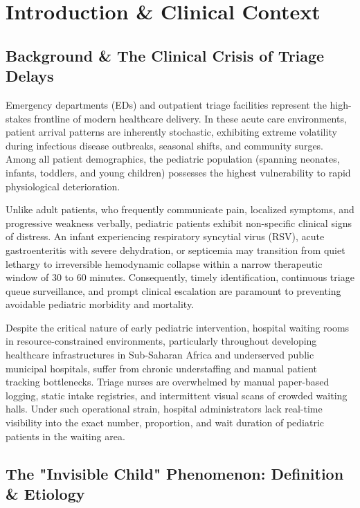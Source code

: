 \chapter{Introduction \& Clinical Context}

\section{Background \& The Clinical Crisis of Triage Delays}

Emergency departments (EDs) and outpatient triage facilities represent the high-stakes frontline of modern healthcare delivery. In these acute care environments, patient arrival patterns are inherently stochastic, exhibiting extreme volatility during infectious disease outbreaks, seasonal shifts, and community surges. Among all patient demographics, the pediatric population (spanning neonates, infants, toddlers, and young children) possesses the highest vulnerability to rapid physiological deterioration.

Unlike adult patients, who frequently communicate pain, localized symptoms, and progressive weakness verbally, pediatric patients exhibit non-specific clinical signs of distress. An infant experiencing respiratory syncytial virus (RSV), acute gastroenteritis with severe dehydration, or septicemia may transition from quiet lethargy to irreversible hemodynamic collapse within a narrow therapeutic window of 30 to 60 minutes. Consequently, timely identification, continuous triage queue surveillance, and prompt clinical escalation are paramount to preventing avoidable pediatric morbidity and mortality.

Despite the critical nature of early pediatric intervention, hospital waiting rooms in resource-constrained environments, particularly throughout developing healthcare infrastructures in Sub-Saharan Africa and underserved public municipal hospitals, suffer from chronic understaffing and manual patient tracking bottlenecks. Triage nurses are overwhelmed by manual paper-based logging, static intake registries, and intermittent visual scans of crowded waiting halls. Under such operational strain, hospital administrators lack real-time visibility into the exact number, proportion, and wait duration of pediatric patients in the waiting area.

\section{The "Invisible Child" Phenomenon: Definition \& Etiology}

